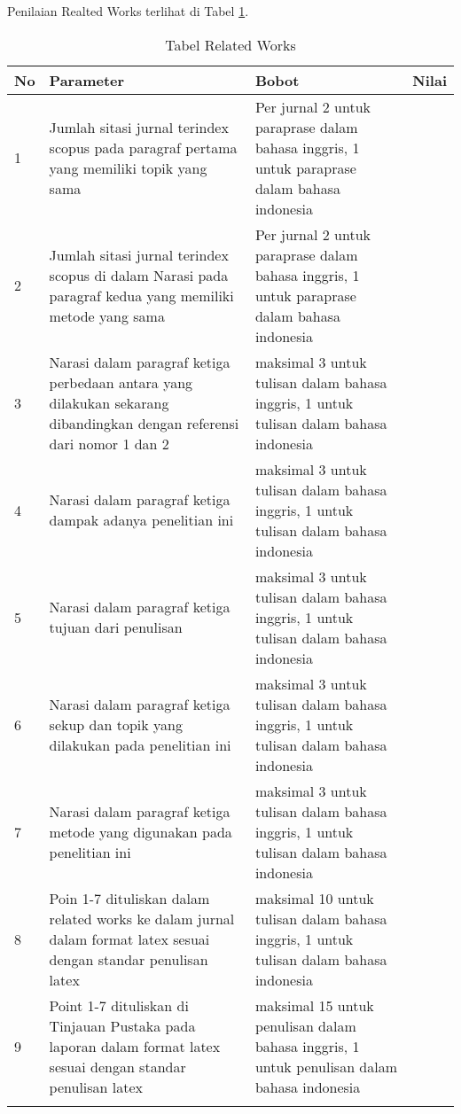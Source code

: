 Penilaian Realted Works terlihat di Tabel \ref{table:contoh}.
\begin{longtable}{|p{}|p{}|p{}|p{}|}

\hline
No&Parameter&Bobot&Nilai\\
\hline
1&Jumlah sitasi jurnal terindex scopus pada paragraf  pertama yang memiliki topik yang sama&Per jurnal 2 untuk paraprase dalam bahasa inggris, 1 untuk paraprase dalam bahasa indonesia&\\ \hline 
2&Jumlah sitasi jurnal terindex scopus di dalam Narasi pada paragraf  kedua yang memiliki metode yang sama&Per jurnal 2 untuk paraprase dalam bahasa inggris, 1 untuk paraprase dalam bahasa indonesia&\\ \hline 
3&Narasi dalam paragraf ketiga perbedaan antara yang dilakukan sekarang dibandingkan dengan referensi dari nomor 1 dan 2&maksimal 3 untuk tulisan dalam bahasa inggris, 1 untuk tulisan dalam bahasa indonesia&\\ \hline 
4&Narasi dalam paragraf ketiga dampak adanya penelitian ini&maksimal 3 untuk tulisan dalam bahasa inggris, 1 untuk tulisan dalam bahasa indonesia&\\ \hline 
5&Narasi dalam paragraf ketiga  tujuan dari penulisan&maksimal 3 untuk tulisan dalam bahasa inggris, 1 untuk tulisan dalam bahasa indonesia&\\ \hline 
6&Narasi dalam paragraf ketiga sekup dan topik yang dilakukan pada penelitian ini&maksimal 3 untuk tulisan dalam bahasa inggris, 1 untuk tulisan dalam bahasa indonesia&\\ \hline 
7&Narasi dalam paragraf ketiga metode yang digunakan pada penelitian  ini&maksimal 3 untuk tulisan dalam bahasa inggris, 1 untuk tulisan dalam bahasa indonesia&\\ \hline 
8&Poin 1-7 dituliskan dalam related works ke dalam jurnal dalam format latex sesuai dengan standar penulisan latex&maksimal 10 untuk tulisan dalam bahasa inggris, 1 untuk tulisan dalam bahasa indonesia&\\ \hline 
9&Point 1-7 dituliskan di Tinjauan Pustaka pada laporan dalam format latex sesuai dengan standar penulisan latex&maksimal 15 untuk penulisan dalam bahasa inggris, 1 untuk penulisan dalam bahasa indonesia&\\ 
\hline
\caption{Tabel Related Works}
\label{table:contoh}
\end{longtable}

  
